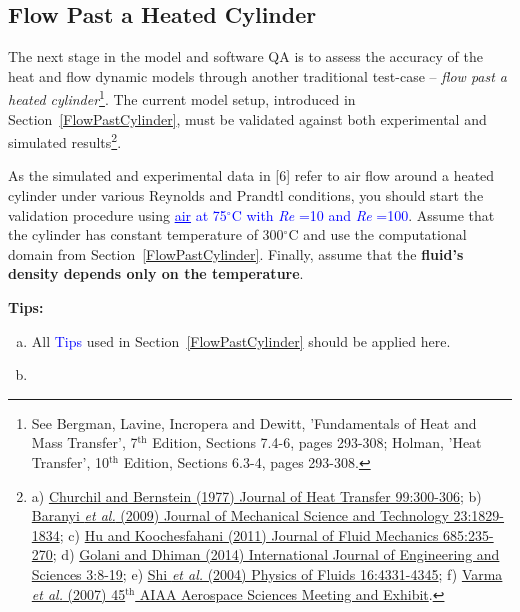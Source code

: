 \documentclass[12pts,a4paper,amsmath,amssymb,floatfix]{article}%
\newcommand{\blue}{\textcolor{blue}}
\newcommand\Rey{\mbox{\textit{Re}}\,\,}
\begin{document}

     \subsection{Flow Past a Heated Cylinder}\label{FlowPastHeatedCylinder}
     The next stage in the model and software QA is to assess the accuracy of the heat and flow dynamic models through another traditional test-case -- {\it flow past a heated cylinder}\footnote{See Bergman, Lavine, Incropera and Dewitt, 'Fundamentals of Heat and Mass Transfer', 7$^{\text{th}}$ Edition, Sections 7.4-6, pages 293-308; Holman, 'Heat Transfer', 10$^{\text{th}}$ Edition, Sections 6.3-4, pages 293-308.}. The current model setup, introduced in Section~\ref{FlowPastCylinder}, must be validated against both experimental and simulated results\footnote{a) \href{https://doi.org/10.1115/1.3450685}{Churchil and Bernstein (1977) Journal of Heat Transfer 99:300-306}; b) \href{https://link.springer.com/article/10.1007/s12206-009-0610-2}{Baranyi {\it et al.} (2009) Journal of Mechanical Science and Technology 23:1829-1834}; c) \href{https://doi.org/10.1017/jfm.2011.313}{Hu and Koochesfahani (2011) Journal of Fluid Mechanics 685:235-270}; d) \href{http://www.theijes.com/papers/v3-i3/Version-4/B0334008019.pdf}{Golani and Dhiman (2014) International Journal of Engineering and Sciences 3:8-19}; e) \href{http://aip.scitation.org/doi/pdf/10.1063/1.1804547}{Shi {\it et al.} (2004) Physics of Fluids 16:4331-4345}; f) \href{http://dept.ku.edu/~cfdku/papers/aiaa-2007-0801.pdf}{Varma {\it et al.} (2007) 45$^{\text{th}}$ AIAA Aerospace Sciences Meeting and Exhibit}.}.

     As the simulated and experimental data in [6] refer to air flow around a heated cylinder under various Reynolds and Prandtl conditions, you should start the validation procedure using \blue{\underline{air} at 75$^{\circ}$C with \Rey=10 and \Rey=100}. Assume that the cylinder has constant temperature of 300$^{\circ}$C and use the computational domain from Section~\ref{FlowPastCylinder}. Finally, assume that the {\bf fluid's density depends only on the temperature}.



     \begin{shaded}
        \begin{center} {\bf Tips: } \end{center}
        \begin{enumerate}[a)]
           \item All \blue{Tips} used in Section~\ref{FlowPastCylinder} should be applied here.
           \item 
        \end{enumerate}
     \end{shaded}
\end{document}
